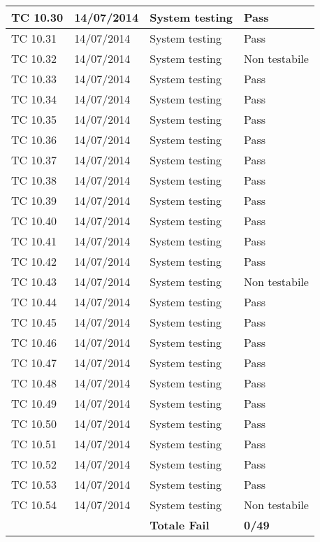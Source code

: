 \begin{longtable}{|p{3cm}|p{3cm}|p{3cm}|p{3cm}|}
	\hline
	TC 10.30		& 14/07/2014 			& System testing		& Pass \tabularnewline
	\hline
	TC 10.31		& 14/07/2014 			& System testing		& Pass \tabularnewline
	\hline
	TC 10.32		& 14/07/2014 			& System testing		& Non testabile \tabularnewline
	\hline
	TC 10.33		& 14/07/2014 			& System testing		& Pass \tabularnewline
	\hline
	TC 10.34		& 14/07/2014 			& System testing		& Pass \tabularnewline
	\hline
	TC 10.35		& 14/07/2014 			& System testing		& Pass \tabularnewline
	\hline
	TC 10.36		& 14/07/2014 			& System testing		& Pass \tabularnewline
	\hline
	TC 10.37		& 14/07/2014 			& System testing		& Pass \tabularnewline
	\hline
	TC 10.38		& 14/07/2014 			& System testing		& Pass \tabularnewline
	\hline
	TC 10.39		& 14/07/2014 			& System testing		& Pass \tabularnewline
	\hline
	TC 10.40		& 14/07/2014 			& System testing		& Pass \tabularnewline
	\hline
	TC 10.41		& 14/07/2014 			& System testing		& Pass \tabularnewline
	\hline
	TC 10.42		& 14/07/2014 			& System testing		& Pass \tabularnewline
	\hline
	TC 10.43		& 14/07/2014 			& System testing		& Non testabile \tabularnewline
	\hline
	TC 10.44		& 14/07/2014 			& System testing		& Pass \tabularnewline
	\hline
	TC 10.45		& 14/07/2014 			& System testing		& Pass \tabularnewline
	\hline
	TC 10.46		& 14/07/2014 			& System testing		& Pass \tabularnewline
	\hline
	TC 10.47		& 14/07/2014 			& System testing		& Pass \tabularnewline
	\hline
	TC 10.48		& 14/07/2014 			& System testing		& Pass \tabularnewline
	\hline
	TC 10.49		& 14/07/2014 			& System testing		& Pass \tabularnewline
	\hline
	TC 10.50		& 14/07/2014 			& System testing		& Pass \tabularnewline
	\hline
	TC 10.51		& 14/07/2014 			& System testing		& Pass \tabularnewline
	\hline
	TC 10.52		& 14/07/2014 			& System testing		& Pass \tabularnewline
	\hline
	TC 10.53		& 14/07/2014 			& System testing		& Pass \tabularnewline
	\hline
	TC 10.54		& 14/07/2014 			& System testing		& Non testabile \tabularnewline
	\hline
				&				& \textbf{Totale Fail}	& \textbf{0/49} \tabularnewline
	\hline
\end{longtable}